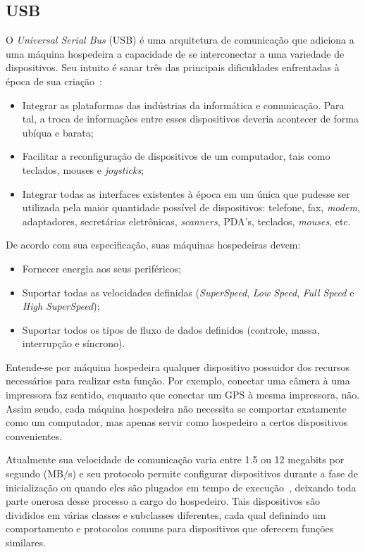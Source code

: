 \subsection{USB}

O \emph{Universal Serial Bus} (USB) é uma arquitetura de comunicação que adiciona a uma máquina hospedeira a capacidade de se interconectar a uma variedade de dispositivos. Seu intuito é sanar três das principais dificuldades enfrentadas à época de sua criação~\cite{usbspec}:

\begin{itemize}
	\item Integrar as plataformas das indústrias da informática e comunicação. Para tal, a troca de informações entre esses dispositivos deveria acontecer de forma ubíqua e barata;
	\item Facilitar a reconfiguração de dispositivos de um computador, tais como teclados, mouses e \emph{joysticks};
	\item Integrar todas as interfaces existentes à época em um única que pudesse ser utilizada pela maior quantidade possível de dispositivos: telefone, fax, \emph{modem}, adaptadores, secretárias eletrônicas, \emph{scanners}, PDA's, teclados, \emph{mouses}, etc.
\end{itemize}

De acordo com sua especificação, suas máquinas hospedeiras devem:

\begin{itemize}
	\item Fornecer energia aos seus periféricos;
	\item Suportar todas as velocidades definidas (\emph{SuperSpeed}, \emph{Low Speed}, \emph{Full Speed} e \emph{High SuperSpeed});
	\item Suportar todos os tipos de fluxo de dados definidos (controle, massa, interrupção e síncrono).
\end{itemize}

Entende-se por máquina hospedeira qualquer dispositivo possuidor dos recursos necessários para realizar esta função. Por exemplo, conectar uma câmera à uma impressora faz sentido, enquanto que conectar um GPS à mesma impressora, não. Assim sendo, cada máquina hospedeira não necessita se comportar exatamente como um computador, mas apenas servir como hospedeiro a certos dispositivos convenientes.

Atualmente sua velocidade de comunicação varia entre 1.5 ou 12 megabits por segundo (MB/s) e seu protocolo permite configurar dispositivos durante a fase de inicialização ou quando eles são plugados em tempo de execução~\cite{hid}, deixando toda parte onerosa desse processo a cargo do hospedeiro. Tais dispositivos são divididos em várias classes e subclasses diferentes, cada qual definindo um comportamento e protocolos comuns para dispositivos que oferecem funções similares.

